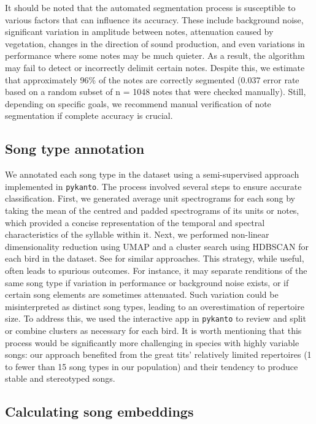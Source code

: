 It should be noted that the automated segmentation process is susceptible to various factors that can influence its accuracy. These include background noise, significant variation in amplitude between notes, attenuation caused by vegetation, changes in the direction of sound production, and even variations in performance where some notes may be much quieter. As a result, the algorithm may fail to detect or incorrectly delimit certain notes. Despite this, we estimate that approximately 96\% of the notes are correctly segmented (0.037 error rate based on a random subset of n = 1048 notes that were checked manually). Still, depending on specific goals, we recommend manual verification of note segmentation if complete accuracy is crucial.

\subsection{Song type annotation}

We annotated each song type in the dataset using a semi-supervised approach implemented in \texttt{pykanto}. The process involved several steps to ensure accurate classification. First, we generated average unit spectrograms for each song by taking the mean of the centred and padded spectrograms of its units or notes, which provided a concise representation of the temporal and spectral characteristics of the syllable within it. Next, we performed non-linear dimensionality reduction using UMAP \parencite{mcinnes2018} and a cluster search using HDBSCAN \parencite{mcinnes2017} for each bird in the dataset. See \parencite{sainburg2020a, thomas2021} for similar approaches. This strategy, while useful, often leads to spurious outcomes. For instance, it may separate renditions of the same song type if variation in performance or background noise exists, or if certain song elements are sometimes attenuated. Such variation could be misinterpreted as distinct song types, leading to an overestimation of repertoire size. To address this, we used the interactive app in \texttt{pykanto} to review and split or combine clusters as necessary for each bird. It is worth mentioning that this process would be significantly more challenging in species with highly variable songs: our approach benefited from the great tits' relatively limited repertoires (1 to fewer than 15 song types in our population) and their tendency to produce stable and stereotyped songs.

\subsection{Calculating song embeddings}

